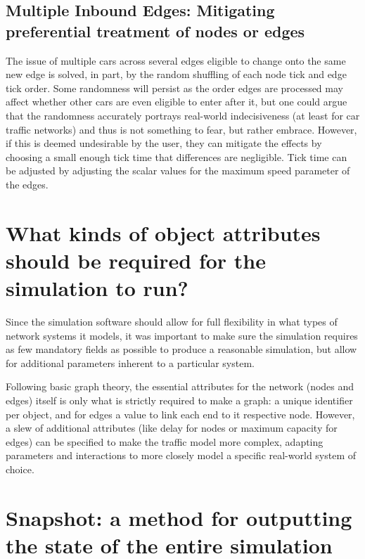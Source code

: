 \subsection{Multiple Inbound Edges:  Mitigating preferential treatment of nodes or edges}
\par The issue of multiple cars across several edges eligible to change onto the same new edge is solved, in part, by the random shuffling of each node tick and edge tick order.  Some randomness will persist as the order edges are processed may affect whether other cars are even eligible to enter after it, but one could argue that the randomness accurately portrays real-world indecisiveness (at least for car traffic networks) and thus is not something to fear, but rather embrace.  However, if this is deemed undesirable by the user, they can mitigate the effects by choosing a small enough tick time that differences are negligible.  Tick time can be adjusted by adjusting the scalar values for the maximum speed parameter of the edges.


\section{What kinds of object attributes should be required for the simulation to run?}

\par Since the simulation software should allow for full flexibility in what types of network systems it models, it was important to make sure the simulation requires as few mandatory fields as possible to produce a reasonable simulation, but allow for additional parameters inherent to a particular system.  \\

\par Following basic graph theory, the essential attributes for the network (nodes and edges) itself is only what is strictly required to make a graph:  a unique identifier per object, and for edges a value to link each end to it respective node. However, a slew of additional attributes (like delay for nodes or maximum capacity for edges) can be specified to make the traffic model more complex, adapting parameters and interactions to more closely model a specific real-world system of choice.



\section{Snapshot:  a method for outputting the state of the entire simulation}

